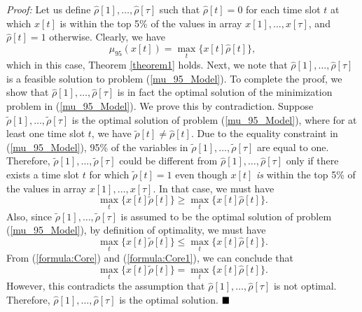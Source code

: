 \documentclass[10pt,journal,compsoc]{IEEEtran}
\begin{document}
\emph{Proof:} Let us define $\widehat{\rho}[1], \ldots, \widehat{\rho}[\tau]$ such that $\widehat{\rho}[t]=0$ for each time slot $t$ at which $x[t]$ is within the top 5\% of the values in array $x[1], \ldots,x[\tau]$, and $\widehat{\rho}[t]=1$ otherwise. Clearly, we have
\begin{equation}
\mu_{95}(x[t])=\max_t \{x[t]\widehat{\rho}[t]\},
\end{equation}
\noindent which in this case, Theorem \ref{theorem1} holds.
Next, we  note that $\widehat{\rho}[1], \ldots, \widehat{\rho}[\tau]$ is a feasible solution to problem (\ref{mu_95_Model}). To complete the proof, we  show that $\widehat{\rho}[1], \ldots, \widehat{\rho}[\tau]$ is in fact the optimal solution of the minimization problem in (\ref{mu_95_Model}). We prove this by contradiction. Suppose $\tilde{\rho}[1], \ldots, \tilde{\rho}[\tau]$ is the optimal solution of problem (\ref{mu_95_Model}), where for at least one time slot $t$, we have $\tilde{\rho}[t]\neq \widehat{\rho}[t]$. Due to the equality constraint in (\ref{mu_95_Model}), 95\% of the variables in $\tilde{\rho}[1], \ldots, \tilde{\rho}[\tau]$ are equal to one. Therefore, $\tilde{\rho}[1], \ldots, \tilde{\rho}[\tau]$ could be different from $\widehat{\rho}[1], \ldots, \widehat{\rho}[\tau]$ only if there exists a time slot $t$ for which $\tilde{\rho}[t] = 1$ even though $x[t]$ \emph{is} within the top 5\% of the values in array $x[1], \ldots,x[\tau]$. In that case, we must have
\begin{equation}\label{formula:Core}
\max_t \{x[t]\tilde{\rho}[t]\} \geq \max_t \{x[t]\widehat{\rho}[t]\}.
\end{equation}
Also, since $\tilde{\rho}[1], \ldots, \tilde{\rho}[\tau]$ is assumed to be the optimal solution of problem (\ref{mu_95_Model}), by definition of optimality, we must have
\begin{equation}\label{formula:Core1}
\max_t \{x[t]\tilde{\rho}[t]\} \leq \max_t \{x[t]\widehat{\rho}[t]\}.
\end{equation}
From (\ref{formula:Core}) and (\ref{formula:Core1}), we can conclude that
\begin{equation}
\max_t \{x[t]\tilde{\rho}[t]\} = \max_t \{x[t]\widehat{\rho}[t]\}.
\end{equation}
However, this contradicts the assumption that $\widehat{\rho}[1], \ldots, \widehat{\rho}[\tau]$ is not optimal. Therefore, $\widehat{\rho}[1], \ldots, \widehat{\rho}[\tau]$ is the optimal solution.  $\hfill \blacksquare$


\vspace{0.2cm}
\end{document}
